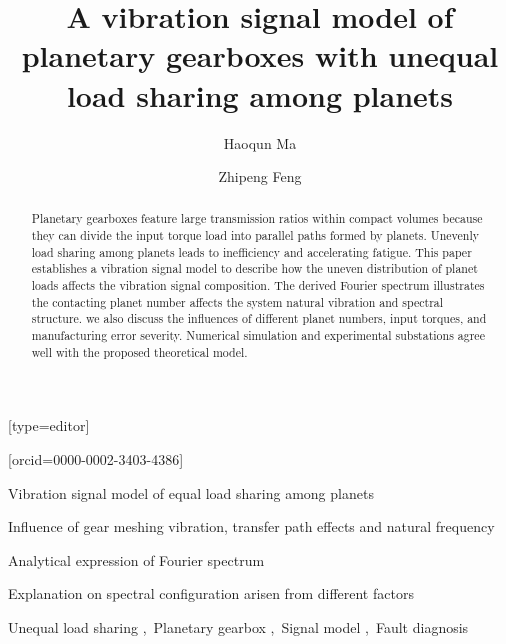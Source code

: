 \documentclass[a4paper,fleqn]{cas-sc}%
\begin{document}
\let\WriteBookmarks\relax
\def\floatpagepagefraction{1}
\def\textpagefraction{.001}
\title[mode = title]{A vibration signal model of planetary gearboxes with unequal load sharing among planets}
\author[1]{Haoqun Ma}[type=editor]
\address[1]{University of Science and Technology Beijing, No.30, Xueyuan Road, Haidian District, Beijing.}
\author[1]{Zhipeng Feng}[orcid=0000-0002-3403-4386]
\cormark[1]
%
%
% 
\begin{abstract}
    Planetary gearboxes feature large transmission ratios within compact volumes because they can divide the input torque load into parallel paths formed by planets. Unevenly load sharing among planets leads to inefficiency and accelerating fatigue. This paper establishes a vibration signal model to describe how the uneven distribution of planet loads affects the vibration signal composition. The derived Fourier spectrum illustrates the contacting planet number affects the system natural vibration and spectral structure. we also discuss the influences of different planet numbers, input torques, and manufacturing error severity. Numerical simulation and experimental substations agree well with the proposed theoretical model.
\end{abstract}
\begin{highlights}
    \item Vibration signal model of equal load sharing among planets
    \item Influence of gear meshing vibration, transfer path effects and natural frequency
    \item Analytical expression of Fourier spectrum 
    \item Explanation on spectral configuration arisen from different factors
\end{highlights}
\begin{keywords}
    Unequal load sharing \sep\ Planetary gearbox \sep\ Signal model \sep\ Fault diagnosis
\end{keywords}
    
\maketitle
\def\degree{${}^{\circ}$}
\def\myscale{0.5}
\end{document}
